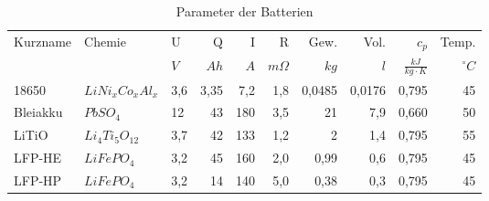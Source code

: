 \begin{table}\centering
	\begin{tabularx}{\textwidth}{XXlrrrrrrr}
		\toprule
		Kurzname & Chemie           & U   &    Q &   I &         R &   Gew. &   Vol. &                  $c_p$ &       Temp. \\
		         &                  & $V$ & $Ah$ & $A$ & $m\Omega$ &   $kg$ &    $l$ & $\frac{kJ}{kg\cdot K}$ & $^{\circ}C$ \\ \midrule
		18650    & $LiNi_xCo_xAl_x$ & 3,6 & 3,35 & 7,2 &       1,8 & 0,0485 & 0,0176 &                  0,795 &          45 \\
		Bleiakku & $PbSO_4$         & 12  &   43 & 180 &       3,5 &     21 &    7,9 &                  0,660 &          50 \\
		LiTiO    & $Li_4Ti_5O_{12}$ & 3,7 &   42 & 133 &       1,2 &      2 &    1,4 &                  0,795 &          55 \\
		LFP-HE   & $LiFePO_4$       & 3,2 &   45 & 160 &       2,0 &   0,99 &    0,6 &                  0,795 &          45 \\
		LFP-HP   & $LiFePO_4$       & 3,2 &   14 & 140 &       5,0 &   0,38 &    0,3 &                  0,795 &          45 \\ \bottomrule
	\end{tabularx}
	\caption{Parameter der Batterien}
	\label{vergleichstabellen_speichertechnologien}
\end{table}
